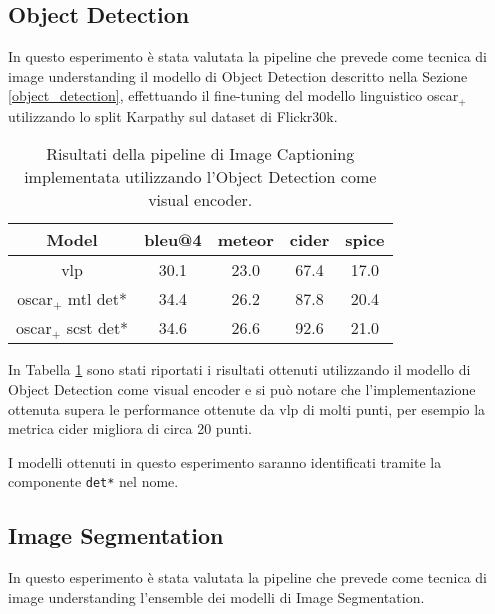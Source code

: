 \subsection{Object Detection}\label{test_detection}
In questo esperimento è stata valutata la pipeline che prevede come tecnica di image understanding il modello di Object Detection descritto nella Sezione \ref{object_detection}, effettuando il fine-tuning del modello linguistico \acrshort{oscar}$_+$ utilizzando lo split Karpathy sul dataset di Flickr30k.
\begin{table}[H]
\footnotesize
\begin{center}
\begin{tabular}{||c c c c c||} 
 \hline
 \textbf{Model} & \textbf{\acrshort{bleu}@4} & \textbf{\acrshort{meteor}} & \textbf{\acrshort{cider}} & \textbf{\acrshort{spice}}\\ [0.5ex] 
 \hline\hline
 \acrshort{vlp} \cite{zhou2020unified} & 30.1 & 23.0 & 67.4 & 17.0\\
 \hline
 \acrshort{oscar}$_+$ \acrshort{mtl} det* & 34.4 & 26.2 & 87.8 & 20.4\\
 \hline
 \acrshort{oscar}$_+$ \acrshort{scst} det* & 34.6 & 26.6 & 92.6 & 21.0\\
 \hline
\end{tabular}
\caption{Risultati della pipeline di Image Captioning implementata utilizzando l'Object Detection come visual encoder.}
\label{table:3}
\end{center}
\end{table}
In Tabella \ref{table:3} sono stati riportati i risultati ottenuti utilizzando il modello di Object Detection come visual encoder e si può notare che l'implementazione ottenuta supera le performance ottenute da \acrshort{vlp} di molti punti, per esempio la metrica \acrshort{cider} migliora di circa 20 punti.

I modelli ottenuti in questo esperimento saranno identificati tramite la componente \texttt{det*} nel nome.



\subsection{Image Segmentation}
In questo esperimento è stata valutata la pipeline che prevede come tecnica di image understanding l'ensemble dei modelli di Image Segmentation.


